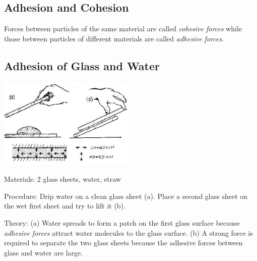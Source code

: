 \begin{multicols}{2}
\columnbreak


\section*{Adhesion and Cohesion}
Forces between particles of the same material are called \emph{cohesive forces} while those between particles of different materials are called \emph{adhesive forces}.


\subsection{Adhesion of Glass and Water}

\begin{center}
\includegraphics[width=0.49\textwidth]{./img/source/adhesion-cohesion.jpg}
\end{center}

\begin{description*}
\item[Materials:]{2 glass sheets, water, straw}
\item[Procedure:]{Drip water on a clean glass sheet (a). Place a second glass sheet on the wet first sheet and try to lift it (b).}
\item[Theory:]{(a) Water spreads to form a patch on the first glass surface because \emph{adhesive forces}
attract water molecules to the glass surface.
(b) A strong force is required to separate the two glass sheets because the adhesive forces
between glass and water are large.}
\end{description*}


\end{multicols}

